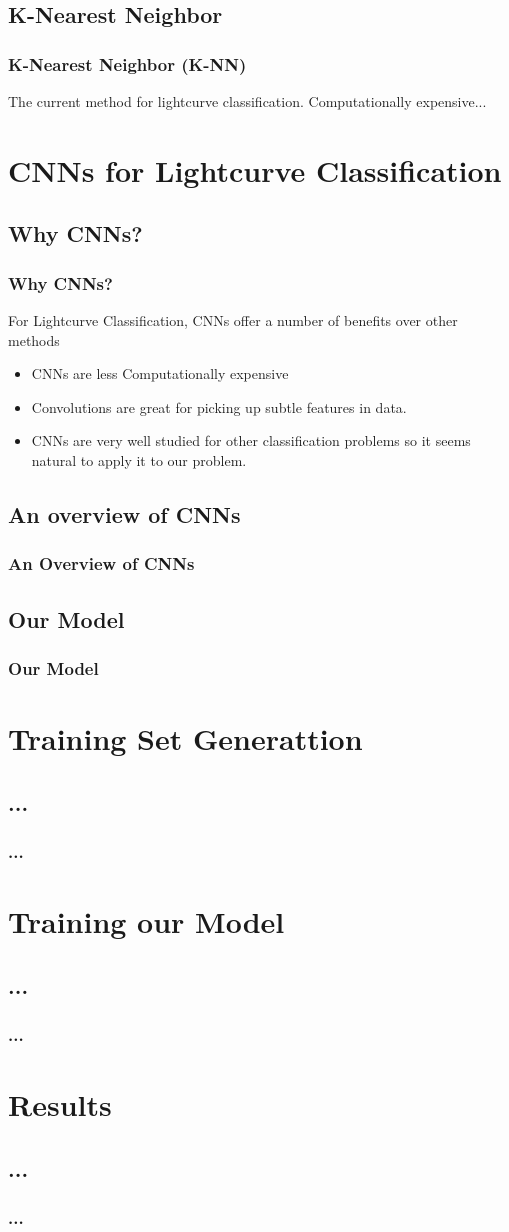 \documentclass[
	11pt, %
]{beamer}
\begin{document}
\subsection{K-Nearest Neighbor}
\begin{frame}
	\frametitle{K-Nearest Neighbor (K-NN)}
	The current method for lightcurve classification.
	Computationally expensive...
\end{frame}
\section{CNNs for Lightcurve Classification}
\subsection{Why CNNs?}
\begin{frame}
	\frametitle{Why CNNs?}
	For Lightcurve Classification, CNNs offer a number of benefits over other methods
	\begin{itemize}
		\item
			CNNs are less Computationally expensive
		\item
			Convolutions are great for picking up subtle features in data.
		\item
			CNNs are very well studied for other classification problems so it seems natural to apply it to our problem.
	\end{itemize}
\end{frame}
\subsection{An overview of CNNs}
\begin{frame}
	\frametitle{An Overview of CNNs}

\end{frame}
\subsection{Our Model}
\begin{frame}
	\frametitle{Our Model}
\end{frame}
\section{Training Set Generattion}
\subsection{...}
\begin{frame}
	\frametitle{...}
\end{frame}
\section{Training our Model}
\subsection{...}

\begin{frame}
	\frametitle{...}
\end{frame}
\section{Results}
\subsection{...}
\begin{frame}
	\frametitle{...}
\end{frame}
\end{document}
